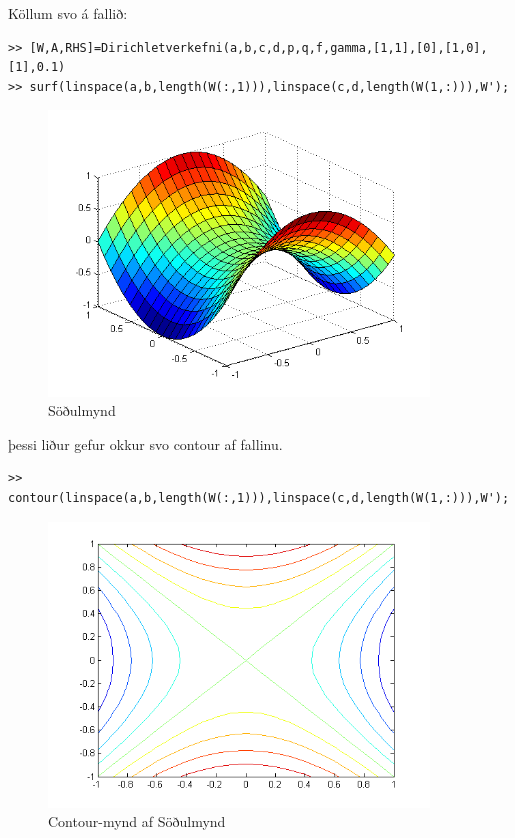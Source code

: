 \documentclass[11pt,a4paper,titlepage]{article}
\begin{document}
Köllum svo á fallið:
\begin{verbatim}
>> [W,A,RHS]=Dirichletverkefni(a,b,c,d,p,q,f,gamma,[1,1],[0],[1,0],[1],0.1)
>> surf(linspace(a,b,length(W(:,1))),linspace(c,d,length(W(1,:))),W'); 
\end{verbatim}
 \begin{figure}[h!]
     \centering
     \includegraphics[width=0.9\textwidth]{sodulmynd1.png}
     \caption{Söðulmynd}
     \label{fig:awesome_image5}
 \end{figure}
 \newpage
þessi liður gefur okkur svo contour af fallinu. 
\begin{verbatim}
>> contour(linspace(a,b,length(W(:,1))),linspace(c,d,length(W(1,:))),W');
\end{verbatim}
 \begin{figure}[h!]
     \centering
     \includegraphics[width=0.9\textwidth]{sodulmynd_contour.png}
     \caption{Contour-mynd af Söðulmynd}
     \label{fig:awesome_image6}
 \end{figure}
\newpage
\end{document}
